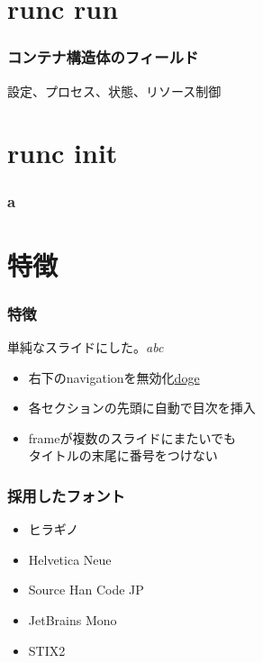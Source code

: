 \documentclass[unicode, 14pt, aspectratio=169]{beamer}
\begin{document}
\section{runc run}
\begin{frame}[t]
  \frametitle{コンテナ構造体のフィールド}
  設定、プロセス、状態、リソース制御
\end{frame}
\begin{frame}[t]
  \frametitle{}
\end{frame}
\section{runc init}
\begin{frame}[t]
  \frametitle{a}
\end{frame}
\section{特徴}
\begin{frame}[t]
  \frametitle{特徴}
    単純なスライドにした。\textit{abc}
  \vspace{0.2\paperheight}
  \begin{itemize}
    \item 右下のnavigationを無効化\href{https://google.com}{doge}
    \item 各セクションの先頭に自動で目次を挿入
    \item frameが複数のスライドにまたいでも\\タイトルの末尾に番号をつけない
  \end{itemize}
\end{frame}


\begin{frame}
\frametitle{採用したフォント}
\begin{itemize}
\item ヒラギノ
\item Helvetica Neue
\item Source Han Code JP
\item JetBrains Mono
\item STIX2
\end{itemize}
\end{frame}
\end{document}
